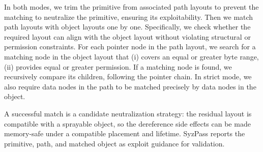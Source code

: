 In both modes, we trim the primitive from associated path layouts to prevent the matching to neutralize the primitive, ensuring its exploitability. Then we match path layouts with object layouts one by one. Specifically, we check whether the required layout can align with the object layout without violating structural or permission constraints. For each pointer node in the path layout, we search for a matching node in the object layout that (i) covers an equal or greater byte range, (ii) provides equal or greater permission.
If a matching node is found, we recursively compare its children, following the pointer chain. In strict mode, we also require data nodes in the path to be matched precisely by data nodes in the object. 

A successful match is a candidate neutralization strategy: the residual layout is compatible with a sprayable object, so the dereference side effects can be made memory-safe under a compatible placement and lifetime. SyzPass reports the primitive, path, and matched object as exploit guidance for validation.
